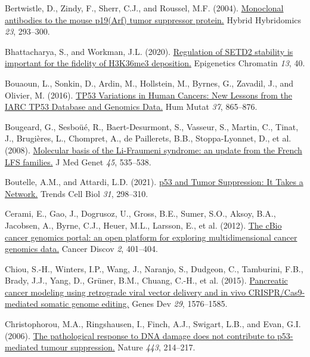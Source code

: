 \begin{CSLReferences}{0}{0}
\leavevmode{}%
Bertwistle, D., Zindy, F., Sherr, C.J., and Roussel, M.F. (2004). \href{https://doi.org/10.1089/hyb.2004.23.293}{Monoclonal antibodies to the mouse p19(Arf) tumor suppressor protein.} Hybrid Hybridomics \emph{23}, 293--300.

\leavevmode{}%
Bhattacharya, S., and Workman, J.L. (2020). \href{https://doi.org/10.1186/s13072-020-00362-8}{Regulation of SETD2 stability is important for the fidelity of H3K36me3 deposition.} Epigenetics Chromatin \emph{13}, 40.

\leavevmode{}%
Bouaoun, L., Sonkin, D., Ardin, M., Hollstein, M., Byrnes, G., Zavadil, J., and Olivier, M. (2016). \href{https://doi.org/10.1002/humu.23035}{TP53 Variations in Human Cancers: New Lessons from the IARC TP53 Database and Genomics Data.} Hum Mutat \emph{37}, 865--876.

\leavevmode{}%
Bougeard, G., Sesboüé, R., Baert-Desurmont, S., Vasseur, S., Martin, C., Tinat, J., Brugières, L., Chompret, A., de Paillerets, B.B., Stoppa-Lyonnet, D., et al. (2008). \href{https://doi.org/10.1136/jmg.2008.057570}{Molecular basis of the Li-Fraumeni syndrome: an update from the French LFS families.} J Med Genet \emph{45}, 535--538.

\leavevmode{}%
Boutelle, A.M., and Attardi, L.D. (2021). \href{https://doi.org/10.1016/j.tcb.2020.12.011}{p53 and Tumor Suppression: It Takes a Network.} Trends Cell Biol \emph{31}, 298--310.

\leavevmode{}%
Cerami, E., Gao, J., Dogrusoz, U., Gross, B.E., Sumer, S.O., Aksoy, B.A., Jacobsen, A., Byrne, C.J., Heuer, M.L., Larsson, E., et al. (2012). \href{https://doi.org/10.1158/2159-8290.cd-12-0095}{The cBio cancer genomics portal: an open platform for exploring multidimensional cancer genomics data.} Cancer Discov \emph{2}, 401--404.

\leavevmode{}%
Chiou, S.-H., Winters, I.P., Wang, J., Naranjo, S., Dudgeon, C., Tamburini, F.B., Brady, J.J., Yang, D., Grüner, B.M., Chuang, C.-H., et al. (2015). \href{https://doi.org/10.1101/gad.264861.115}{Pancreatic cancer modeling using retrograde viral vector delivery and in vivo CRISPR/Cas9-mediated somatic genome editing.} Genes Dev \emph{29}, 1576--1585.

\leavevmode{}%
Christophorou, M.A., Ringshausen, I., Finch, A.J., Swigart, L.B., and Evan, G.I. (2006). \href{https://doi.org/10.1038/nature05077}{The pathological response to DNA damage does not contribute to p53-mediated tumour suppression.} Nature \emph{443}, 214--217.


\end{CSLReferences}
